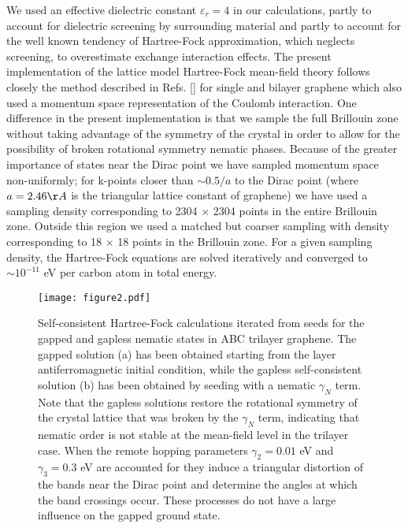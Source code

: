 \documentclass[twocolumn,prb,showpacs,preprintnumbers,amsmath,amssymb]{revtex4}
\begin{document}
We used an effective dielectric constant $\varepsilon_r = 4$ in our 
calculations, partly to account for dielectric screening by surrounding material and 
partly to account for the well known tendency of Hartree-Fock 
approximation, which neglects screening, to overestimate exchange interaction effects.\cite{exchangereduc}
The present implementation of the lattice model Hartree-Fock mean-field theory 
follows closely the method described in Refs. [] for 
single and bilayer graphene which also used a momentum space representation
of the Coulomb interaction.  
One difference in the present implementation is that we sample the full 
Brillouin zone without taking advantage of the symmetry of the crystal in order
to allow for the possibility of broken rotational symmetry nematic phases.
Because of the greater importance of states near the Dirac point we have 
sampled momentum space non-uniformly; for k-points closer than
$\sim 0.5/a$ to the Dirac point (where $a = 2.46 \AA$ is the triangular 
lattice constant of graphene) 
we have used a sampling density corresponding to 2304 $\times$ 2304
points in the entire Brillouin zone.
Outside this region we used a matched but coarser sampling with density
corresponding to 18 $\times$ 18 points in the 
Brillouin zone.
For a given sampling density, the Hartree-Fock equations are 
solved iteratively and converged to $\sim 10^{-11}$ eV per carbon atom in total energy.

\begin{figure}[t]
\begin{center}
\texttt{[image: figure2.pdf]} 
\caption{
Self-consistent Hartree-Fock calculations iterated from seeds
for the gapped and gapless nematic  %
states in ABC trilayer graphene. 
The gapped solution (a) has been obtained starting from the layer
antiferromagnetic initial condition, while the gapless self-consistent solution (b) has been
obtained by seeding with a nematic $\gamma_N$ term. 
Note that the gapless solutions
restore the rotational symmetry of the crystal lattice
that was broken by the $\gamma_N$ term, indicating that nematic order is not stable at the 
mean-field level in the trilayer case.
When the remote hopping parameters $\gamma_2 = 0.01$ eV and $\gamma_3 = 0.3$ eV
are accounted for they induce a triangular distortion of the bands near the Dirac point
and determine the angles at which the band crossings occur.  These processes do not 
have a large influence on the gapped ground state.  
}
\label{energy}
\end{center}
\end{figure}
\end{document}
